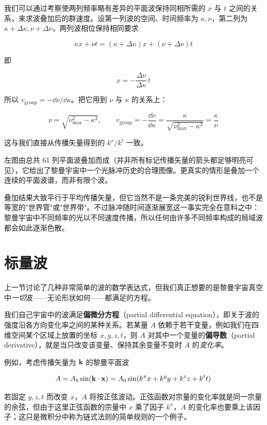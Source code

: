 我们可以通过考察使两列频率略有差异的平面波保持同相所需的 $x$ 与 $t$ 之间的关系，来求波叠加后的群速度。设第一列波的空间、时间频率为 $\kappa,\nu$，第二列为 $\kappa+\Delta\kappa,\nu+\Delta\nu$，两列波相位保持相同要求

\[
\kappa x+\nu t=(\kappa+\Delta\kappa)x+(\nu+\Delta\nu)t
\]

即

\[
x=-\frac{\Delta\nu}{\Delta\kappa}\,t
\]

所以 $v_{\text{group}}=-\dd\nu/\dd\kappa$。把它用到 $\nu$ 与 $\kappa$ 的关系上：

\[
\nu=\sqrt{\nu_{\max}^{2}-\kappa^{2}},\qquad
v_{\text{group}}=-\frac{\dd\nu}{\dd\kappa}=\frac{\kappa}{\sqrt{\nu_{\max}^{2}-\kappa^{2}}}=\frac{\kappa}{\nu}
\]

这与我们直接从传播矢量得到的 $k^{x}/k^{t}$ 一致。


左图由总共 61 列平面波叠加而成（并非所有标记传播矢量的箭头都足够明亮可见），它给出了黎曼宇宙中一个光脉冲历史的合理图像。更真实的情形是叠加一个连续的平面波谱，而非有限个波。

叠加结果大致平行于平均传播矢量，但它当然不是一条完美的锐利世界线，也不是等宽的"世界管"或"世界带"。不过脉冲随时间逐渐展宽这一事实完全在意料之中：黎曼宇宙中不同频率的光以不同速度传播，所以任何由许多不同频率构成的局域波都会如此逐渐色散。

\section{标量波}

上一节讨论了几种非常简单的波的数学表达式，但我们真正想要的是黎曼宇宙真空中\emph{一切}波——无论形状如何——都满足的方程。

我们自己宇宙中的波满足\textbf{偏微分方程}（partial differential equation），即关于波的强度沿各方向变化率之间的某种关系。若某量 $A$ 依赖于若干变量，例如我们在四维空间某个区域上放置的坐标 $x,y,z,t$，则 $A$ 对其中一个变量的\textbf{偏导数}（partial derivative），就是当只改变该变量、保持其余变量不变时 $A$ 的\emph{变化率}。

例如，考虑传播矢量为 $\mathbf{k}$ 的黎曼平面波

\[
A=A_{0}\sin(\mathbf{k}\cdot\mathbf{x})=A_{0}\sin(k^{x}x+k^{y}y+k^{z}z+k^{t}t)
\]

若固定 $y,z,t$ 而改变 $x$，$A$ 将按正弦波动。正弦函数对宗量的变化率就是同一宗量的余弦，但由于这里正弦函数的宗量中 $x$ 乘了因子 $k^{x}$，$A$ 的变化率也要乘上该因子；这只是微积分中称为链式法则的简单规则的一个例子。

